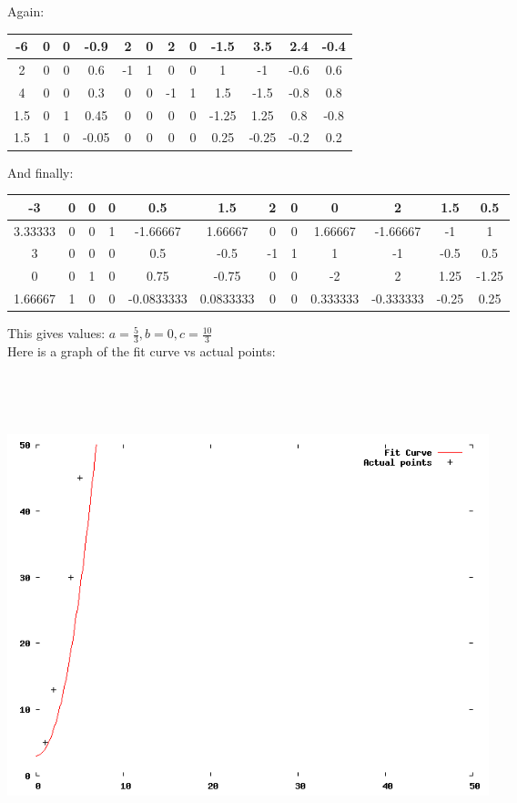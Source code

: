 \documentclass[a4paper,12pt]{article}
\begin{document}
Again:
\begin{center}
\begin{tabular}{| c | c  c  c  c  c  c  c  c  c  c  c |}
\hline
-6 & 0 & 0 & -0.9 & 2 & 0 & 2 & 0 & -1.5 & 3.5 & 2.4 & -0.4\\
\hline
2 & 0 & 0 & 0.6 & -1 & 1 & 0 & 0 & 1 & -1 & -0.6 & 0.6\\
4 & 0 & 0 & 0.3 & 0 & 0 & -1 & 1 & 1.5 & -1.5 & -0.8 & 0.8\\
1.5 & 0 & 1 & 0.45 & 0 & 0 & 0 & 0 & -1.25 & 1.25 & 0.8 & -0.8\\
1.5 & 1 & 0 & -0.05 & 0 & 0 & 0 & 0 & 0.25 & -0.25 & -0.2 & 0.2\\
\hline
\end{tabular}
\end{center}
And finally:
\begin{center}
\begin{tabular}{| c | c  c  c  c  c  c  c  c  c  c  c |}
\hline
-3 & 0 & 0 & 0 & 0.5 & 1.5 & 2 & 0 & 0 & 2 & 1.5 & 0.5\\
\hline
3.33333 & 0 & 0 & 1 & -1.66667 & 1.66667 & 0 & 0 & 1.66667 & -1.66667 & -1 & 1\\
3 & 0 & 0 & 0 & 0.5 & -0.5 & -1 & 1 & 1 & -1 & -0.5 & 0.5\\
0 & 0 & 1 & 0 & 0.75 & -0.75 & 0 & 0 & -2 & 2 & 1.25 & -1.25\\
1.66667 & 1 & 0 & 0 & -0.0833333 & 0.0833333 & 0 & 0 & 0.333333 & -0.333333 & -0.25 & 0.25\\
\hline
\end{tabular}
\end{center}
This gives values: \(a=\frac{5}{3}, b=0, c=\frac{10}{3} \)\\
Here is a graph of the fit curve vs actual points: \\
\begin{center}
  \includegraphics[width=14cm, height=14cm, keepaspectratio=true]{315.png}
\end{center}
\end{document}
